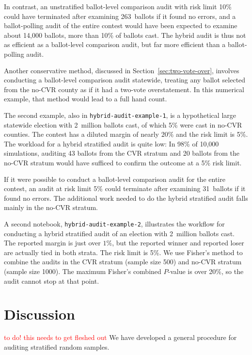 \documentclass[runningheads]{llncs}
\newcommand{\comment}[1]{\textcolor{red}{\sc #1}}
\begin{document}
In contrast, an unstratified ballot-level comparison audit with risk limit 10\% could have terminated
after examining 263~ballots if it found no errors, and a ballot-polling audit of the entire contest 
would have been expected to examine about 14,000 ballots, more than 10\% of ballots cast.
The hybrid audit is thus not as efficient as a ballot-level comparison audit, but far more efficient than
a ballot-polling audit.

Another conservative method, discussed in Section~\ref{sec:two-vote-over},
involves conducting a ballot-level comparison audit statewide,
treating any ballot selected from the no-CVR county as if it had a two-vote overstatement.
In this numerical example, that method would lead to a full hand count.

The second example, also in \texttt{hybrid-audit-example-1}, 
is a hypothetical large statewide election with 
2~million ballots cast, of which 5\% were cast in no-CVR counties.
The contest has a diluted margin of nearly $20\%$ and the risk limit is 5\%.
The workload for a hybrid stratified audit is quite low:
In 98\% of 10,000 simulations, auditing 43 ballots from the 
CVR stratum and 20 ballots from the no-CVR stratum
would have sufficed to confirm the outcome at a 5\% risk limit.

If it were possible to conduct a ballot-level comparison audit for the entire contest, 
an audit at risk limit 5\% could terminate after examining 31~ballots if it found no errors.
The additional work needed to do the hybrid stratified audit falls mainly in the no-CVR stratum.

A second notebook, \texttt{hybrid-audit-example-2}, illustrates the 
workflow for conducting a hybrid stratified audit of an election with 2~million ballots cast.
The reported margin is just over $1\%$, but the reported winner
and reported loser are actually tied in both strata.  
The risk limit is 5\%.
We use Fisher's method to combine the audits in the CVR stratum (sample size 500) 
and no-CVR stratum (sample size 1000).
The maximum Fisher's combined $P$-value is over 20\%, so the audit cannot stop at that point.



\section{Discussion} \label{sec:discussion}

\comment{to do! this needs to get fleshed out}
We have developed a general procedure for auditing stratified random samples.
\end{document}
